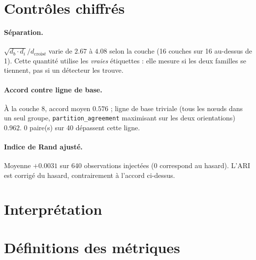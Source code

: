 \documentclass[11pt,a4paper]{article}
\begin{document}
\section{Contrôles chiffrés}


\paragraph{Séparation.} $\sqrt{d_b \cdot d_i} / d_{\text{croisé}}$ varie
de $2.67$ à $4.08$ selon la couche
(16 couches sur 16 au-dessus de 1).
Cette quantité utilise les \emph{vraies} étiquettes : elle mesure si les deux
familles se tiennent, pas si un détecteur les trouve.



\paragraph{Accord contre ligne de base.} À la couche 8, accord moyen
$0.576$ ; ligne de base triviale (tous les n\oe uds dans
un seul groupe, \texttt{partition\_agreement} maximisant sur les deux
orientations) $0.962$.
0 paire(s) sur 40 dépassent cette ligne.



\paragraph{Indice de Rand ajusté.} Moyenne $+0.0031$ sur
640 observations injectées (0 correspond au hasard). L'ARI est corrigé
du hasard, contrairement à l'accord ci-dessus.


\section{Interprétation}



\section{Définitions des métriques}
\end{document}
